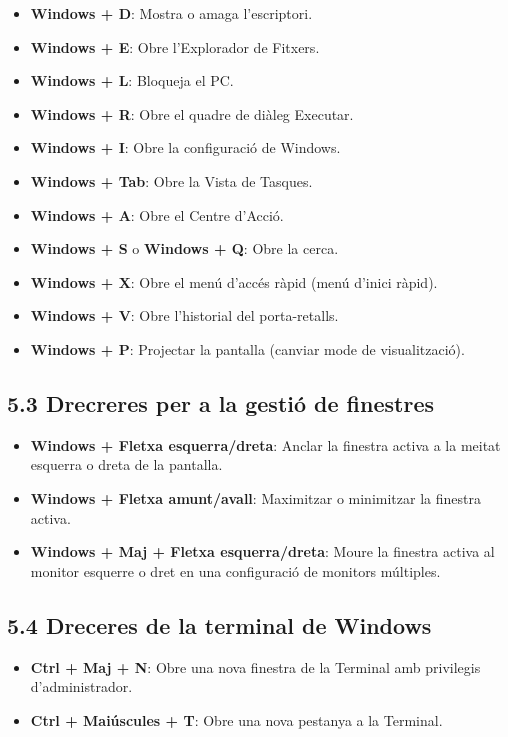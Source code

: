 \documentclass[
  a4paper,
]{article}
\providecommand{\tightlist}{%
  \setlength{\itemsep}{0pt}\setlength{\parskip}{0pt}}
\begin{document}
\begin{itemize}
\tightlist
\item
  \textbf{Windows + D}: Mostra o amaga l'escriptori.
\item
  \textbf{Windows + E}: Obre l'Explorador de Fitxers.
\item
  \textbf{Windows + L}: Bloqueja el PC.
\item
  \textbf{Windows + R}: Obre el quadre de diàleg Executar.
\item
  \textbf{Windows + I}: Obre la configuració de Windows.
\item
  \textbf{Windows + Tab}: Obre la Vista de Tasques.
\item
  \textbf{Windows + A}: Obre el Centre d'Acció.
\item
  \textbf{Windows + S} o \textbf{Windows + Q}: Obre la cerca.
\item
  \textbf{Windows + X}: Obre el menú d'accés ràpid (menú d'inici ràpid).
\item
  \textbf{Windows + V}: Obre l'historial del porta-retalls.
\item
  \textbf{Windows + P}: Projectar la pantalla (canviar mode de
  visualització).
\end{itemize}

\subsection{5.3 Drecreres per a la gestió de
finestres}\label{drecreres-per-a-la-gestiuxf3-de-finestres}

\begin{itemize}
\tightlist
\item
  \textbf{Windows + Fletxa esquerra/dreta}: Anclar la finestra activa a
  la meitat esquerra o dreta de la pantalla.
\item
  \textbf{Windows + Fletxa amunt/avall}: Maximitzar o minimitzar la
  finestra activa.
\item
  \textbf{Windows + Maj + Fletxa esquerra/dreta}: Moure la finestra
  activa al monitor esquerre o dret en una configuració de monitors
  múltiples.
\end{itemize}

\subsection{5.4 Dreceres de la terminal de
Windows}\label{dreceres-de-la-terminal-de-windows}

\begin{itemize}
\tightlist
\item
  \textbf{Ctrl + Maj + N}: Obre una nova finestra de la Terminal amb
  privilegis d'administrador.
\item
  \textbf{Ctrl + Maiúscules + T}: Obre una nova pestanya a la Terminal.
\end{itemize}
\end{document}
